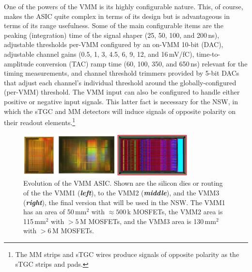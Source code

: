 One of the powers of the VMM is its highly configurable nature.
This, of course, makes the ASIC quite complex in terms of its design but is
advantageous in terms of its range usefulness.
Some of the main configurable items are the peaking (integration) time of the signal shaper
(25, 50, 100, and 200\,ns), adjustable thresholds per-VMM configured by an on-VMM
10-bit (DAC),
adjustable channel gains (0.5, 1, 3, 4.5, 6, 9, 12, and 16\,mV/fC),
time-to-amplitude conversion (TAC) ramp time (60, 100, 350, and 650\,ns) relevant for the timing measurements,
and channel threshold trimmers provided by 5-bit DACs that adjust each channel's individual
threshold around the globally-configured (per-VMM) threshold.
The VMM input can also be configured to handle either positive or negative input
signals.
This latter fact is necessary for the NSW, in which the sTGC and MM detectors
will induce signals of opposite polarity on their readout elements.\footnote{The MM strips and
sTGC wires produce signals of opposite polarity as the sTGC strips and pads.}

\begin{figure}[!htb]
    \begin{center}
        \includegraphics[width=0.8\textwidth]{figures/nsw/vmm/vmms_silicon}
        \caption{
            Evolution of the VMM ASIC.
            Shown are the silicon dies or routing of the the VMM1 (\textbf{\textit{left}}), to the VMM2 (\textbf{\textit{middle}}), and 
            the VMM3 (\textbf{\textit{right}}), the final version that will be used in the NSW.
            The VMM1 has an area of 50\,mm$^2$ with $\approx 500$\,k MOSFETs, the VMM2 area is 115\,mm$^2$ with $>5$\,M MOSFETs,
            and the VMM3 area is 130\,mm$^2$ with $>6$\,M MOSFETs.\protect\footnotemark%
        }
        \label{fig:vmms_silicon}
    \end{center}
\end{figure}

